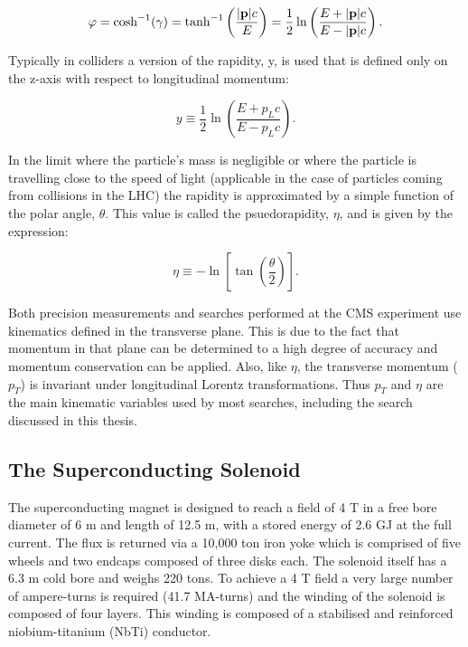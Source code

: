 \begin{equation}
\varphi = \cosh^{-1}(\gamma) = \tanh^{-1}\left(\frac{|\bold{p}|c}{E}\right) = \frac{1}{2}\ln\left( \frac{E+|\bold{p}|c}{E-|\bold{p}|c}\right).
\label{eq:rapidity_phi}
\end{equation}


Typically in colliders a version of the rapidity, y, is used that is defined only on the z-axis with respect to longitudinal momentum:

\begin{equation}
y \equiv  \frac{1}{2}\ln\left( \frac{E+p_Lc}{E-p_Lc}\right).
\label{eq:rapidity_y}
\end{equation}


In the limit where the particle's mass is negligible or where the particle is travelling close to the speed of light (applicable in the case of particles coming from collisions in the LHC) the rapidity is approximated by a simple function of the polar angle, $\theta$.  This value is called the psuedorapidity, $\eta$, and is given by the expression:


\begin{equation}
\eta \equiv  -\ln\left[ \tan\left(\frac{\theta}{2}\right)\right].
\label{eq:pseudorapidity}
\end{equation}

Both precision measurements and searches performed at the CMS experiment use kinematics defined in the transverse plane.  This is due to the fact that momentum in that plane can be determined to a high degree of accuracy and momentum conservation can be applied.  Also, like $\eta$, the transverse momentum ($p_T$) is invariant under longitudinal Lorentz transformations.  Thus $p_T$ and $\eta$ are the main kinematic variables used by most searches, including the search discussed in this thesis.  


\subsection{The Superconducting Solenoid}
\label{solenoid}

The superconducting magnet is designed to reach a field of 4 T in a free bore diameter of 6 m and length of 12.5 m, with a stored energy of 2.6 GJ at the full current.  The flux is returned via a 10,000 ton iron yoke which is comprised of five wheels and two endcaps composed of three disks each.  The solenoid itself has a 6.3 m cold bore and weighs 220 tons.  To achieve a 4 T field a very large number of ampere-turns is required (41.7 MA-turns) and the winding of the solenoid is composed of four layers.  This winding is composed of a stabilised and reinforced niobium-titanium (NbTi) conductor.

